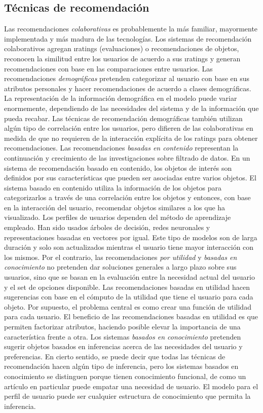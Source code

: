  	\subsection{Técnicas de recomendación}
	 	Las recomendaciones \emph{colaborativas} es probablemente la más familiar, mayormente implementada y más madura de las tecnologías. Los sistemas de recomendación colaborativos agregan \i{ratings} (evaluaciones) o recomendaciones de objetos, reconocen la similitud entre los usuarios de acuerdo a sus \i{ratings} y generan recomendaciones con base en las comparaciones entre usuarios.
	 	Las recomendaciones \emph{demográficas} pretenden categorizar al usuario con base en sus atributos personales y hacer recomendaciones de acuerdo a clases demográficas. La representación de la información demográfica en el modelo puede variar enormemente, dependiendo de las necesidades del sistema y de la información que pueda recabar. Las técnicas de recomendación demográficas también utilizan algún tipo de correlación entre los usuarios, pero difieren de las colaborativas en medida de que no requieren de la interacción explícita de los ratings para obtener recomendaciones. 
	 	Las recomendaciones \emph{basadas en contenido} representan la continuación y crecimiento de las investigaciones sobre filtrado de datos. En un sistema de recomendación basado en contenido, los objetos de interés son definidos por sus características que pueden ser asociadas entre varios objetos. El sistema basado en contenido utiliza la información de los objetos para categorizarlos a través de una correlación entre los objetos y entonces, con base en la interacción del usuario, recomendar objetos similares a los que ha visualizado. Los perfiles de usuarios dependen del método de aprendizaje empleado. Han sido usados árboles de decisión, redes neuronales y representaciones basadas en vectores por igual. Este tipo de modelos son de larga duración y solo son actualizados mientras el usuario tiene mayor interacción con los mismos.
	 	Por el contrario, las recomendaciones \emph{por utilidad} y \emph{basadas en conocimiento} no pretenden dar soluciones generales a largo plazo sobre sus usuarios, sino que se basan en la evaluación entre la necesidad actual del usuario y el set de opciones disponible. Las recomendaciones basadas en utilidad hacen sugerencias con base en el cómputo de la utilidad que tiene el usuario para cada objeto. Por supuesto, el problema central es como crear una función de utilidad para cada usuario. El beneficio de las recomendaciones basadas en utilidad es que permiten factorizar atributos, haciendo posible elevar la importancia de una característica frente a otra. 
	 	Los sistemas \emph{basados en conocimiento} pretenden sugerir objetos basados en inferencias acerca de las necesidades del usuario y preferencias. En cierto sentido, se puede decir que todas las técnicas de recomendación hacen algún tipo de inferencia, pero los sistemas basados en conocimiento se distinguen porque tienen conocimiento funcional, de como un artículo en particular puede empatar una necesidad de usuario. El modelo para el perfil de usuario puede ser cualquier estructura de conocimiento que permita la inferencia. \cite{5}

